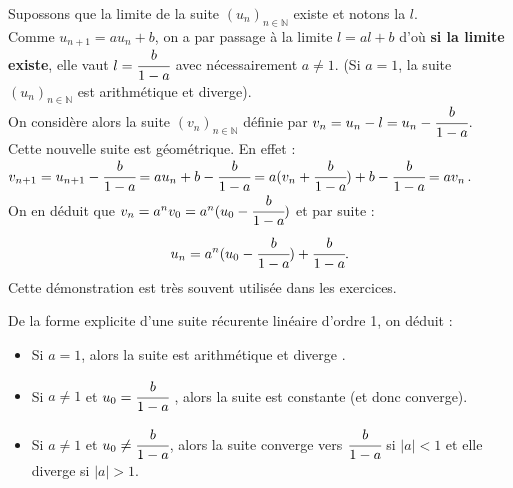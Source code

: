 \documentclass[french]{book}
\newcommand{\N}{\mathbb {N}}
\newcommand{\suite}[1][u]{\left( #1_{n} \right)_{n\in\N}}
\newcommand{\un}{\suite}
\newcommand{\vn}{\suite[v]}
\newcommand{\pa}[1]{(#1)}
\newcommand{\abs}[1]{\vert #1 \vert}
\begin{document}
\begin{demo}
Supossons que la limite de la suite $\un$ existe et notons la $l$.\\
Comme $u_{n+1} = au_n + b$, on a par passage à la limite $l=al+b$ d'où \textbf{si la limite existe}, elle vaut $l=\cfrac{b}{1-a}$ avec nécessairement $a\neq1$. (Si $a=1$, la suite $\un$ est arithmétique et diverge).\\
On considère alors la suite $\vn$ définie par $v_n=u_n-l=u_n-\cfrac{b}{1-a}$.\\
Cette nouvelle suite est géométrique. En effet :\\
$v_{n+1}=u_{n+1}-\cfrac{b}{1-a}=au_n+b-\cfrac{b}{1-a}=a\pa{v_n+\cfrac{b}{1-a}}+b-\cfrac{b}{1-a}=av_n$.\\
On en déduit que $v_n=a^nv_0=a^n\pa{u_0-\cfrac{b}{1-a}}$ et par suite :
$$u_n = a^n \pa{u_0-\cfrac{b}{1-a}}+ \cfrac{b}{1-a}.$$
Cette démonstration est très souvent utilisée dans les exercices.
\end{demo}





\begin{thm}[Convergence]
De la forme explicite d'une suite récurente linéaire d'ordre 1, on déduit :
	\begin{itemize}
	\item Si $a = 1$, alors la suite est arithmétique et diverge .
	\item Si $a\neq1$ et $u_0 =\cfrac{b}{1-a}$ , alors la suite est constante (et donc converge).
	\item Si $a\neq 1$ et $u_0\neq \cfrac{b}{1-a}$, alors la suite converge vers $\cfrac{b}{1-a}$ si $\abs{a}<1$ et elle diverge si $\abs{a}>1$.
\end{itemize}

\end{thm}
\end{document}
